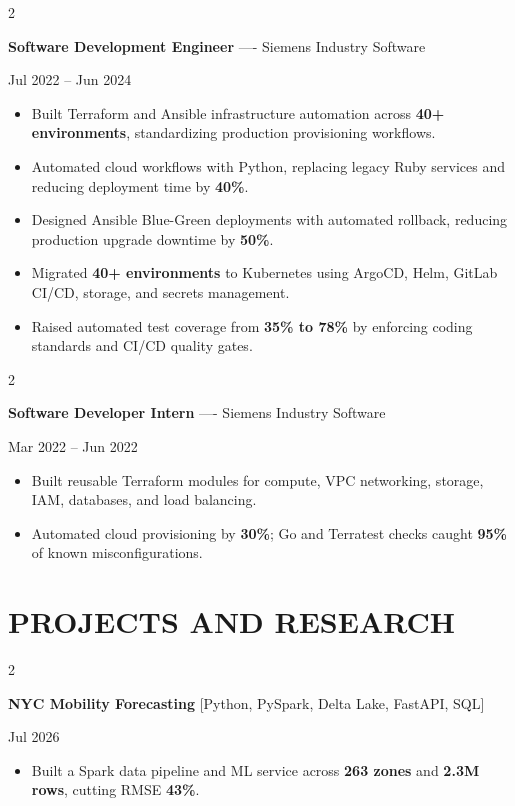 \documentclass[10pt, letterpaper]{article}
\newenvironment{highlights}{
    \begin{itemize}[
        topsep=0.10 cm,
        parsep=0.06 cm,
        partopsep=0pt,
        itemsep=0.06 cm,
        leftmargin=12pt
    ]
}{
    \end{itemize}
}
\newenvironment{twocolentry}[2][]{
    \onecolentry
    \def\secondColumn{#2}
    \setcolumnwidth{\fill, 4.5 cm}
    \begin{paracol}{2}
}{
    \switchcolumn \raggedleft \secondColumn
    \end{paracol}
    \endonecolentry
}
\begin{document}
\vspace{0.15 cm}

\begin{twocolentry}{Jul 2022 -- Jun 2024}
\textbf{Software Development Engineer} ---- Siemens Industry Software
\end{twocolentry}
\begin{highlights}
  \item Built Terraform and Ansible infrastructure automation across \textbf{40+ environments}, standardizing production provisioning workflows.
  \item Automated cloud workflows with Python, replacing legacy Ruby services and reducing deployment time by \textbf{40\%}.
  \item Designed Ansible Blue-Green deployments with automated rollback, reducing production upgrade downtime by \textbf{50\%}.
  \item Migrated \textbf{40+ environments} to Kubernetes using ArgoCD, Helm, GitLab CI/CD, storage, and secrets management.
  \item Raised automated test coverage from \textbf{35\% to 78\%} by enforcing coding standards and CI/CD quality gates.
\end{highlights}

\vspace{0.15 cm}

\begin{twocolentry}{Mar 2022 -- Jun 2022}
\textbf{Software Developer Intern} ---- Siemens Industry Software
\end{twocolentry}
\begin{highlights}
  \item Built reusable Terraform modules for compute, VPC networking, storage, IAM, databases, and load balancing.
  \item Automated cloud provisioning by \textbf{30\%}; Go and Terratest checks caught \textbf{95\%} of known misconfigurations.
\end{highlights}

\vspace{0.15 cm}

\section{PROJECTS AND RESEARCH}
\begin{twocolentry}{Jul 2026}
\textbf{NYC Mobility Forecasting} [Python, PySpark, Delta Lake, FastAPI, SQL]
\end{twocolentry}
\begin{highlights}
  \item Built a Spark data pipeline and ML service across \textbf{263 zones} and \textbf{2.3M rows}, cutting RMSE \textbf{43\%}.
\end{highlights}
\end{document}
